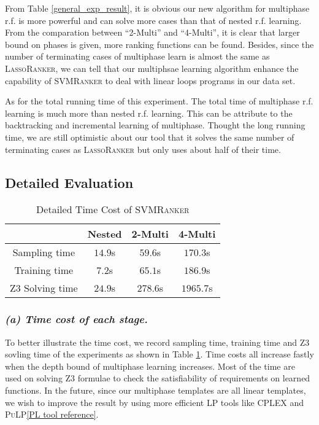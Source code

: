 \documentclass[UTF-8]{article}
\begin{document}
From Table \ref{general_exp_result}, it is obvious our new algorithm for multiphase r.f. is more powerful and can solve more cases than that of nested r.f. learning. From the comparation between ``2-Multi'' and ``4-Multi'', it is clear that larger bound on phases is given, more ranking functions can be found. Besides, since the number of terminating cases of multiphase learn is almost the same as \textsc{LassoRanker}, we can tell that our multiphsae learning algorithm enhance the capability of \textsc{SVMRanker} to deal with linear loops programs in our data set. 

As for the total running time of this experiment. The total time of multiphase r.f. learning is much more than nested r.f. learning. This can be attribute to the backtracking and incremental learning of multiphase.{\color{blue}{lx: Add description of backtracking and incremental learning if the phase bound is not mentioned previously :xl}} Thought the long running time, we are still optimistic about our tool that it solves the same number of terminating cases as \textsc{LassoRanker} but only uses about half of their time.


\subsection{Detailed Evaluation}
\begin{table}
\centering
\begin{tabular}{c|c|c|c}

& Nested & 2-Multi & 4-Multi\\
\hline
Sampling time & $14.9$s& $59.6$s& $170.3$s \\
Training time & $7.2$s& $65.1$s& $186.9$s\\
Z3 Solving time & $24.9$s& $278.6$s& $1965.7$s\\

\end{tabular}
\caption{Detailed Time Cost of \textsc{SVMRanker}}
\label{detailed_time}
\end{table}


\subsubsection{
\textit{(a) Time cost of each stage.}}
To better illustrate the time cost, we record sampling time, training time and Z3 sovling time of the experiments as shown in Table \ref{detailed_time}. Time costs all increase fastly when the depth bound of multiphase learning increases. Most of the time are used on solving Z3 formulae to check the satisfiability of requirements on learned functions. In the future, since our multiphase templates are all linear templates, we wish to improve the result by using more efficient LP tools like \textsc{CPLEX} and \textsc{PuLP}\ref{PL tool reference}.
\end{document}
